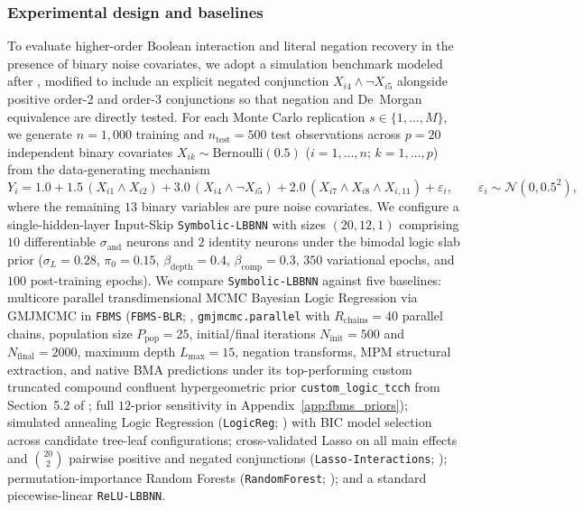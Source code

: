 \documentclass[11pt,a4paper]{article}
\begin{document}
\subsubsection{Experimental design and baselines}
To evaluate higher-order Boolean interaction and literal negation recovery in the presence of binary noise covariates, we adopt a simulation benchmark modeled after \citet{hubin2020bayesian}, modified to include an explicit negated conjunction $X_{i4} \land \neg X_{i5}$ alongside positive order-2 and order-3 conjunctions so that negation and De~Morgan equivalence are directly tested. For each Monte Carlo replication $s \in \{1, \dots, M\}$, we generate $n = 1{,}000$ training and $n_{\text{test}} = 500$ test observations across $p = 20$ independent binary covariates $X_{ik} \sim \mathrm{Bernoulli}(0.5)$ ($i = 1, \dots, n$; $k = 1, \dots, p$) from the data-generating mechanism
\begin{equation}
\label{eq:dgp_logic}
Y_i = 1.0 + 1.5\,(X_{i1} \land X_{i2}) + 3.0\,(X_{i4} \land \neg X_{i5}) + 2.0\,(X_{i7} \land X_{i8} \land X_{i,11}) + \varepsilon_i, \qquad \varepsilon_i \sim \mathcal{N}(0, 0.5^2),
\end{equation}
where the remaining $13$ binary variables are pure noise covariates. We configure a single-hidden-layer Input-Skip \texttt{Symbolic-LBBNN} with sizes $(20, 12, 1)$ comprising $10$ differentiable $\sigma_{\text{and}}$ neurons and $2$ identity neurons under the bimodal logic slab prior ($\sigma_L = 0.28$, $\pi_0 = 0.15$, $\beta_{\text{depth}} = 0.4$, $\beta_{\text{comp}} = 0.3$, $350$ variational epochs, and $100$ post-training epochs). We compare \texttt{Symbolic-LBBNN} against five baselines: multicore parallel transdimensional MCMC Bayesian Logic Regression via GMJMCMC in \texttt{FBMS} (\texttt{FBMS-BLR}; \citealp{hubin2020bayesian, frommlet2025fbms}, \texttt{gmjmcmc.parallel} with $R_{\text{chains}} = 40$ parallel chains, population size $P_{\text{pop}} = 25$, initial/final iterations $N_{\text{init}} = 500$ and $N_{\text{final}} = 2000$, maximum depth $L_{\text{max}} = 15$, negation transforms, MPM structural extraction, and native BMA predictions under its top-performing custom truncated compound confluent hypergeometric prior \texttt{custom\_logic\_tcch} from Section~5.2 of \citealp{frommlet2025fbms}; full $12$-prior sensitivity in Appendix~\ref{app:fbms_priors}); simulated annealing Logic Regression (\texttt{LogicReg}; \citealp{ruczinski2003logic}) with BIC model selection across candidate tree-leaf configurations; cross-validated Lasso on all main effects and $\binom{20}{2}$ pairwise positive and negated conjunctions (\texttt{Lasso-Interactions}; \citealp{friedman2010regularization}); permutation-importance Random Forests (\texttt{RandomForest}; \citealp{wright2017ranger}); and a standard piecewise-linear \texttt{ReLU-LBBNN}.
\end{document}
